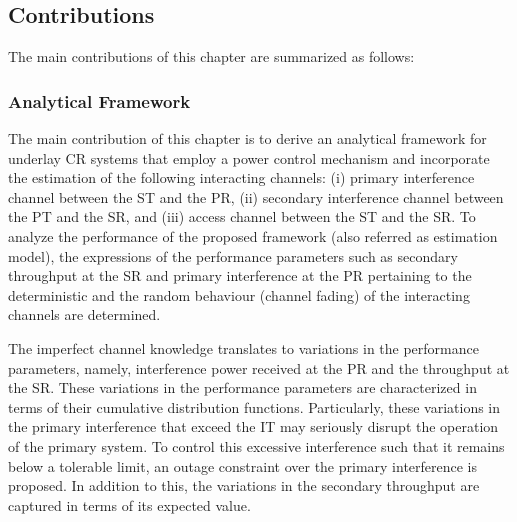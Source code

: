 \subsection{Contributions}
The main contributions of this chapter are summarized as follows: 
\subsubsection{Analytical Framework}
The main contribution of this chapter is to derive an analytical framework for underlay CR systems that employ a power control mechanism and incorporate the estimation of the following interacting channels: (i) primary interference channel between the ST and the PR, (ii) secondary interference channel between the PT and the SR, and (iii) access channel between the ST and the SR. To analyze the performance of the proposed framework (also referred as estimation model), the expressions of the performance parameters such as secondary throughput at the SR and primary interference at the PR pertaining to the deterministic and the random behaviour (channel fading) of the interacting channels are determined.%

The imperfect channel knowledge translates to variations in the performance parameters, namely, interference power received at the PR and the throughput at the SR. These variations in the performance parameters are characterized in terms of their cumulative distribution functions. Particularly, these variations in the primary interference that exceed the IT may seriously disrupt the operation of the primary system. To control this excessive interference such that it remains below a tolerable limit, an outage constraint over the primary interference is proposed. In addition to this, the variations in the secondary throughput are captured in terms of its expected value. %

